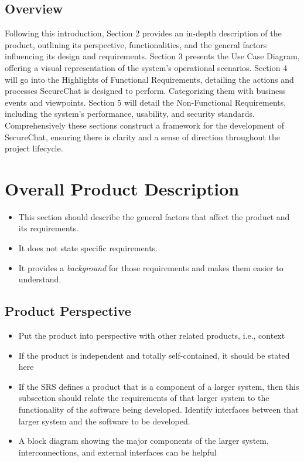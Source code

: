 \documentclass[]{article}
\begin{document}
\subsection{Overview}
\label{sub:overview}
Following this introduction, Section 2 provides an in-depth description of the product, outlining its perspective, functionalities, and the general factors influencing its design and requirements. Section 3 presents the Use Case Diagram, offering a visual representation of the system's operational scenarios. Section 4 will go into the Highlights of Functional Requirements, detailing the actions and processes SecureChat is designed to perform. Categorizing them with business events and viewpoints. Section 5 will detail the Non-Functional Requirements, including the system's performance, usability, and security standards. Comprehensively these sections construct a framework for the development of SecureChat, ensuring there is clarity and a sense of direction throughout the project lifecycle.


\section{Overall Product Description}
\label{sec:overall_description}

\begin{itemize}
	\item This section should describe the general factors that affect the product and its requirements.
	\item It does not state specific requirements.
	\item It provides a \emph{background} for those requirements and makes them easier to understand.
\end{itemize}


\subsection{Product Perspective}
\label{sub:product_perspective}
\begin{itemize}
	\item Put the product into perspective with other related products, i.e., context
	\item If the product is independent and totally self-contained, it should be stated here
	\item If the SRS defines a product that is a component of a larger system, then this subsection should relate the requirements of that larger system to the functionality of the software being developed. Identify interfaces between that larger system and the software to be developed.
	\item A block diagram showing the major components of the larger system, interconnections, and external interfaces can be helpful
\end{itemize}
\end{document}
